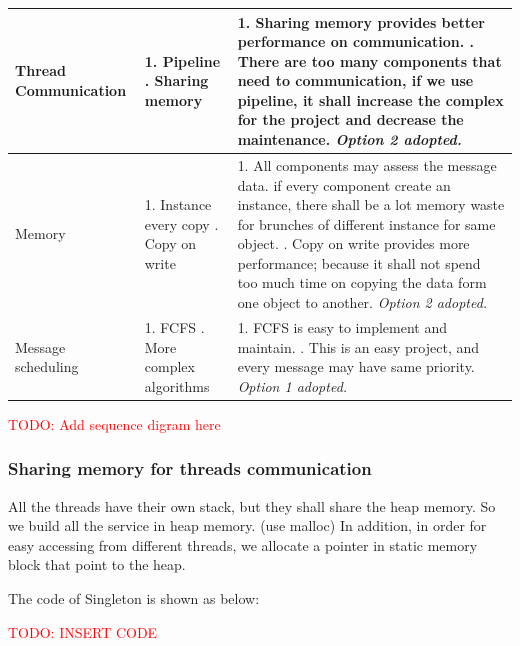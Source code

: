 \documentclass[11pt,a4paper,titlepage]{report}
\begin{document}
\begin{center}
\begin{table}
\begin{tabular}{|p{}|p{}|p{}|}
     Thread Communication & 1. Pipeline \newline 2. Sharing memory & 1. Sharing memory provides better performance on communication. \newline  2. There are too many components that need to communication, if we use pipeline, it shall increase the complex for the project and decrease the maintenance. \newline \textit{Option 2 adopted.
} \\ \hline
     
     Memory & 1. Instance every copy
 \newline 2. Copy on write & 1. All components may assess the message data. if every component create an instance, there shall be a lot memory waste for brunches of different instance for same object.
 \newline  2. Copy on write provides more performance; because it shall not spend too much time on copying the data form one object to another. \newline \textit{Option 2 adopted.
} \\ \hline

     Message scheduling & 1. FCFS \newline 2. More complex algorithms & 1. FCFS is easy to implement and maintain.
 \newline  2. This is an easy project, and every message may have same priority. \newline \textit{Option 1 adopted.
} \\ \hline

\end{tabular}
\end{table}
\end{center}


\textcolor{red}{TODO: Add sequence digram here}

\subsubsection{Sharing memory for threads communication}

All the threads have their own stack, but they shall share the heap memory. So we build all the service in heap memory. (use malloc) In addition,  in order for easy accessing from different threads, we allocate a pointer in static memory block that point to the heap. 

The code of Singleton is shown as below:

\textcolor{red}{TODO: INSERT CODE}
\end{document}
